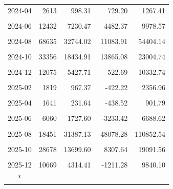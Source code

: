 \begin{longtable}[t]{crrrr}
2024-04 & 2613 & 998.31 & 729.20 & 1267.41\\
\cellcolor{gray!10}{2024-05} & \cellcolor{gray!10}{6324} & \cellcolor{gray!10}{3890.49} & \cellcolor{gray!10}{3146.23} & \cellcolor{gray!10}{4634.75}\\
2024-06 & 12432 & 7230.47 & 4482.37 & 9978.57\\
\cellcolor{gray!10}{2024-07} & \cellcolor{gray!10}{22478} & \cellcolor{gray!10}{11438.37} & \cellcolor{gray!10}{7995.16} & \cellcolor{gray!10}{14881.59}\\
2024-08 & 68635 & 32744.02 & 11083.91 & 54404.14\\
\cellcolor{gray!10}{2024-09} & \cellcolor{gray!10}{83154} & \cellcolor{gray!10}{47607.68} & \cellcolor{gray!10}{34122.51} & \cellcolor{gray!10}{61092.85}\\
2024-10 & 33356 & 18434.91 & 13865.08 & 23004.74\\
\cellcolor{gray!10}{2024-11} & \cellcolor{gray!10}{22663} & \cellcolor{gray!10}{12370.63} & \cellcolor{gray!10}{-5739.37} & \cellcolor{gray!10}{30480.63}\\
2024-12 & 12075 & 5427.71 & 522.69 & 10332.74\\
\cellcolor{gray!10}{2025-01} & \cellcolor{gray!10}{3137} & \cellcolor{gray!10}{1202.15} & \cellcolor{gray!10}{-72.93} & \cellcolor{gray!10}{2477.23}\\
2025-02 & 1819 & 967.37 & -422.22 & 2356.96\\
\cellcolor{gray!10}{2025-03} & \cellcolor{gray!10}{2357} & \cellcolor{gray!10}{849.68} & \cellcolor{gray!10}{54.48} & \cellcolor{gray!10}{1644.87}\\
2025-04 & 1641 & 231.64 & -438.52 & 901.79\\
\cellcolor{gray!10}{2025-05} & \cellcolor{gray!10}{4263} & \cellcolor{gray!10}{1718.88} & \cellcolor{gray!10}{767.20} & \cellcolor{gray!10}{2670.57}\\
2025-06 & 6060 & 1727.60 & -3233.42 & 6688.62\\
\cellcolor{gray!10}{2025-07} & \cellcolor{gray!10}{9803} & \cellcolor{gray!10}{2617.89} & \cellcolor{gray!10}{-5854.84} & \cellcolor{gray!10}{11090.61}\\
2025-08 & 18451 & 31387.13 & -48078.28 & 110852.54\\
\cellcolor{gray!10}{2025-09} & \cellcolor{gray!10}{28214} & \cellcolor{gray!10}{12400.81} & \cellcolor{gray!10}{-33629.84} & \cellcolor{gray!10}{58431.47}\\
2025-10 & 28678 & 13699.60 & 8307.64 & 19091.56\\
\cellcolor{gray!10}{2025-11} & \cellcolor{gray!10}{21301} & \cellcolor{gray!10}{11184.73} & \cellcolor{gray!10}{-8467.59} & \cellcolor{gray!10}{30837.05}\\
2025-12 & 10669 & 4314.41 & -1211.28 & 9840.10\\*
\end{longtable}
